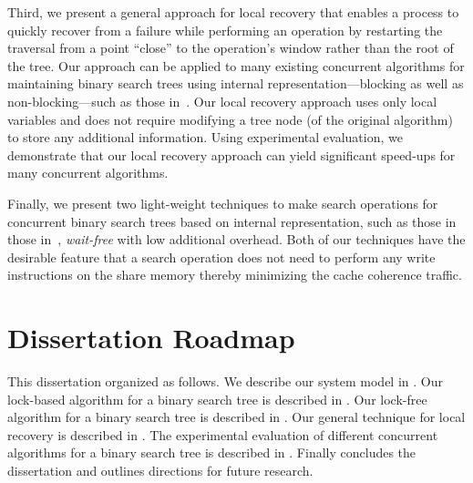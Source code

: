 Third, we present a general approach for local recovery that enables a process to quickly recover from a failure while performing an operation by restarting the traversal from a point ``close'' to the operation's window rather than the root of the tree.  Our approach can be applied to many existing concurrent algorithms for maintaining binary search trees using internal representation---blocking as well as non-blocking---such as those in~\cite{HowJon:2012:SPAA,DraVec+:2014:PPoPP,ArbAtt:2014:PODC,RamMit:2015:PPoPP}. Our local recovery approach uses only local variables and does not require modifying a tree node (of the original algorithm) to store any additional information. Using experimental evaluation, we demonstrate that our local recovery approach can yield significant speed-ups for many concurrent algorithms.

Finally, we present two light-weight techniques to make search operations for concurrent binary search trees based on internal representation, such as those in those in~\cite{HowJon:2012:SPAA,DraVec+:2014:PPoPP,ArbAtt:2014:PODC,RamMit:2015:ICDCN,RamMit:2015:PPoPP}, \emph{wait-free} with low additional overhead. Both of our techniques have the desirable feature that a search operation does not need to perform any write instructions on the share memory thereby minimizing the cache coherence traffic.

\section{Dissertation Roadmap} 
This dissertation organized as follows. We describe our system model in . Our lock-based algorithm for a binary search tree is described in . Our lock-free algorithm for a binary search tree is described in . Our general technique for local recovery is described in . The experimental evaluation of different concurrent algorithms for a binary search tree is described in . Finally  concludes the dissertation and outlines directions for future research.